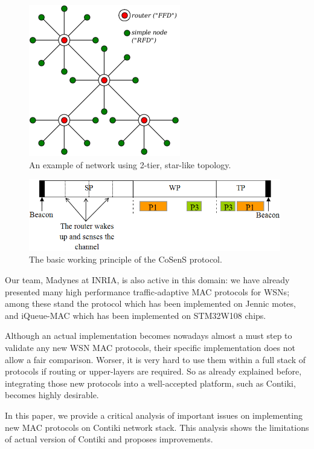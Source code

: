 \documentclass[12pt,twoside,a4paper]{article}
\begin{document}
\begin{figure}[!t]
\centering
\includegraphics{star-topo-net.png}
\caption{An example of network using 2-tier, star-like topology.}
\label{star-topo-net}
\end{figure}
\hfil
\begin{figure}[!t]
\centering
\includegraphics[width=11cm]{superframe.png}
\caption{The basic working principle of the CoSenS protocol.}
\label{cosens-principle}
\end{figure}

Our team, Madynes at INRIA, is also active in this domain: we have already
presented many high performance traffic-adaptive MAC protocols for WSNs;
among these stand the  \cite{cosens} protocol which has been
implemented on Jennic motes, and iQueue-MAC \cite{iqueue-mac} which has
been implemented on STM32W108 chips.

Although an actual implementation becomes nowadays almost a must step
to validate any new WSN MAC protocols, their specific implementation
does not allow a fair comparison. Worser, it is very hard to use them
within a full stack of protocols if routing or upper-layers are required.
So as already explained before, integrating those new protocols into
a well-accepted platform, such as Contiki, becomes highly desirable.

In this paper, we provide a critical analysis of important issues on
implementing new MAC protocols on Contiki network stack. This analysis
shows the limitations of actual version of Contiki and proposes improvements.
\end{document}
